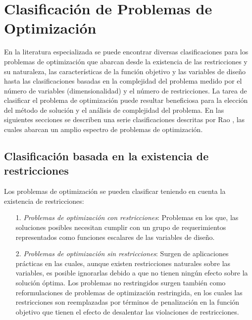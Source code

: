\section{Clasificación de Problemas de Optimización}\label{sec:Clasificación de Problemas de Optimización}
En la literatura especializada se puede encontrar diversas clasificaciones para los problemas de optimización que abarcan desde la existencia de las restricciones y su naturaleza, las características de la función objetivo y las variables de diseño hasta las clasificaciones basadas en la complejidad del problema medido por el número de variables (dimensionalidad) y el número de restricciones\cite{luenberger_linear_2015}. La tarea de clasificar el problema de optimización puede resultar beneficiosa para la elección del método de solución y el análisis de complejidad del problema. En las siguientes secciones se describen una serie clasificaciones descritas por Rao \cite{rao_engineering_2009}, las cuales abarcan un amplio espectro de problemas de optimización.

\subsection{Clasificación basada en la existencia de restricciones}
Los problemas de optimización se pueden clasificar teniendo en cuenta la existencia de restricciones:
\begin{itemize}
\item [1.]  \textit{Problemas de optimización con restricciones}: Problemas en los que, las soluciones posibles necesitan cumplir con un grupo de requerimientos representados como funciones escalares de las variables de diseño.
\item [2.]  \textit{Problemas de optimización sin restricciones}: Surgen de aplicaciones prácticas en las cuales, aunque existen restricciones naturales sobre las variables, es posible ignorarlas debido a que no tienen ningún efecto sobre la solución óptima. Los problemas no restringidos surgen también como reformulaciones de problemas de optimización restringida, en los cuales las restricciones son reemplazadas por términos de penalización en la función objetivo que tienen el efecto de desalentar las violaciones de restricciones.
\end{itemize}

